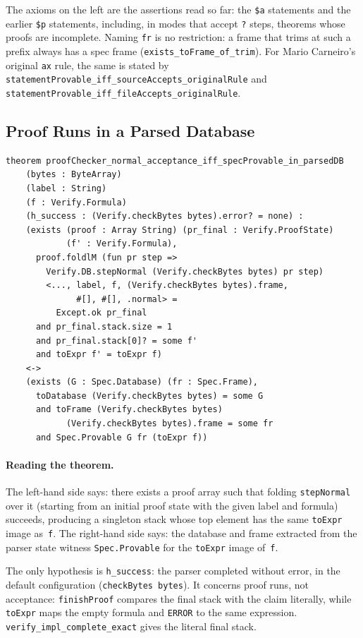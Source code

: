\documentclass[11pt]{article}
\newcommand{\lean}[1]{\lstinline[language=Lean4]{#1}}
\newcommand{\leansmall}[1]{\lstinline[language=Lean4,basicstyle=\ttfamily\footnotesize]{#1}}
\newcommand{\file}[1]{\texttt{#1}}
\begin{document}
The axioms on the left are the assertions read so far: the \verb|$a|
statements and the earlier \verb|$p| statements, including, in modes that
accept \verb|?| steps, theorems whose proofs are incomplete.  Naming
\lean{fr} is no restriction: a frame that trims at such a prefix always
has a spec frame (\lean{exists_toFrame_of_trim}).  For Mario Carneiro's original
\lean{ax} rule, the same is stated by
\leansmall{statementProvable_iff_sourceAccepts_originalRule} and
\leansmall{statementProvable_iff_fileAccepts_originalRule}.

\subsection{Proof Runs in a Parsed Database}

\begin{lstlisting}[caption={Proof runs (\file{KernelCorrectness.lean}).},label=lst:main]
theorem proofChecker_normal_acceptance_iff_specProvable_in_parsedDB
    (bytes : ByteArray)
    (label : String)
    (f : Verify.Formula)
    (h_success : (Verify.checkBytes bytes).error? = none) :
    (exists (proof : Array String) (pr_final : Verify.ProofState)
            (f' : Verify.Formula),
      proof.foldlM (fun pr step =>
        Verify.DB.stepNormal (Verify.checkBytes bytes) pr step)
        <..., label, f, (Verify.checkBytes bytes).frame,
              #[], #[], .normal> =
          Except.ok pr_final
      and pr_final.stack.size = 1
      and pr_final.stack[0]? = some f'
      and toExpr f' = toExpr f)
    <->
    (exists (G : Spec.Database) (fr : Spec.Frame),
      toDatabase (Verify.checkBytes bytes) = some G
      and toFrame (Verify.checkBytes bytes)
            (Verify.checkBytes bytes).frame = some fr
      and Spec.Provable G fr (toExpr f))
\end{lstlisting}

\paragraph{Reading the theorem.}
The left-hand side says: there exists a proof array such that folding
\lean{stepNormal} over it (starting from an initial proof state with
the given label and formula) succeeds, producing a singleton stack
whose top element has the same \lean{toExpr} image as~\lean{f}.
The right-hand side says: the database and frame extracted from
the parser state witness \lean{Spec.Provable} for the \lean{toExpr}
image of~\lean{f}.

The only hypothesis is \lean{h_success}: the parser completed without
error, in the default configuration (\lean{checkBytes bytes}).  It concerns proof
runs, not acceptance: \lean{finishProof} compares the final stack with the
claim literally, while \lean{toExpr} maps the empty formula and
\lean{ERROR} to the same expression.  \lean{verify_impl_complete_exact}
gives the literal final stack.
\end{document}
